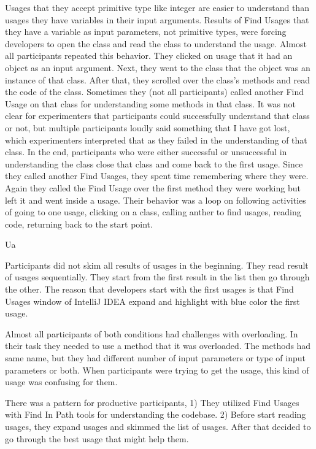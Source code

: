 \documentclass[conference]{IEEEtran}
\begin{document}
Usages that they accept primitive type like integer are easier to understand than usages they have variables in their input arguments. Results of Find Usages that they have a variable as input parameters, not primitive types, were forcing developers to open the class and read the class to understand the usage. Almost all participants repeated this behavior. They clicked on usage that it had an object as an input argument. Next, they went to the class that the object was an instance of that class. After that, they scrolled over the class's methods and read the code of the class. Sometimes they  (not all participants) called another Find Usage on that class for understanding some methods in that class. It was not clear for experimenters that participants could successfully understand that class or not, but multiple participants loudly said something that I have got lost, which experimenters interpreted that as they failed in the understanding of that class. In the end, participants who were either successful or unsuccessful in understanding the class close that class and come back to the first usage. Since they called another Find Usages, they spent time remembering where they were. Again they called the Find Usage over the first method they were working but left it and went inside a usage. Their behavior was a loop on following activities of going to one usage, clicking on a class, calling anther to find usages, reading code, returning back to the start point. \par

Ua\par

Participants did not skim all results of usages in the beginning. They read result of usages sequentially. They start from the first result in the list then go through the other. The reason that developers start with the first usages is that Find Usages window of IntelliJ IDEA expand and highlight with blue color the first usage. \par


Almost all participants of both conditions had challenges with overloading. In their task they needed to use a method that it was overloaded. The methods had same name, but they had different number of input parameters or type of input parameters or both. When participants were trying to get the usage, this kind of usage was confusing for them.\par

There was a pattern for productive participants, 1) They utilized Find Usages with Find In Path tools for understanding the codebase.  2) Before start reading usages, they expand usages and skimmed the list of usages. After that decided to go through the best usage that might help them. \par
\end{document}
